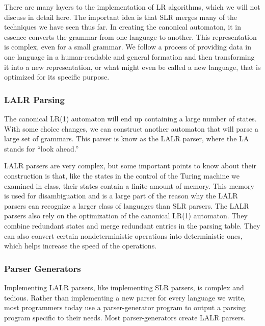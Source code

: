 \documentclass[a4paper, 10pt]{article}
\begin{document}
There are many layers to the implementation of LR algorithms, which we will not discuss in detail here. The important idea is that SLR merges many of the techniques we have seen thus far. In creating the canonical automaton, it in essence converts the grammar from one language to another. This representation is complex, even for a small grammar. We follow a process of providing data in one language in a human-readable and general formation and then transforming it into a new representation, or what might even be called a new language, that is optimized for its specific purpose. 
\subsubsection{LALR Parsing}\label{sec:lalr}
The canonical LR(1) automaton will end up containing a large number of states. With some choice changes, we can construct another automaton that will parse a large set of grammars. This parser is know as the LALR parser, where the LA stands for ``look ahead.''

LALR parsers are very complex, but some important points to know about their construction is that, like the states in the control of the Turing machine we examined in class, their states contain a finite amount of memory. This memory is used for disambiguation and is a large part of the reason why the LALR parsers can recognize a larger class of languages than SLR parsers. The LALR parsers also rely on the optimization of the canonical LR(1) automaton. They combine redundant states and merge redundant entries in the parsing table. They can also convert certain nondeterministic operations into deterministic ones, which helps increase the speed of the operations. 
\subsubsection{Parser Generators}
Implementing LALR parsers, like implementing SLR parsers, is complex and tedious. Rather than implementing a new parser for every language we write, most programmers today use a parser-generator program to output a parsing program specific to their needs. Most parser-generators create LALR parsers.
\end{document}
